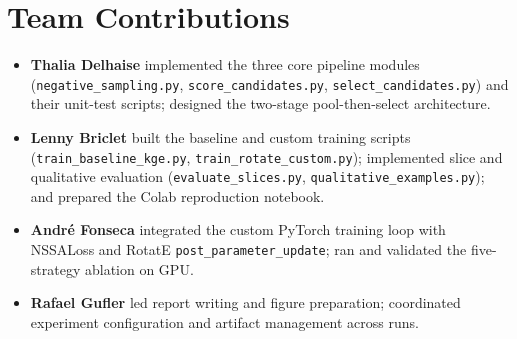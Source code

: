 \documentclass[10pt,twocolumn,letterpaper]{article}
\begin{document}
\section{Team Contributions}
\label{sec:contributions}
\begin{itemize}
  \item \textbf{Thalia Delhaise} implemented the three core pipeline modules
    (\texttt{negative\_sampling.py}, \texttt{score\_candidates.py},
    \texttt{select\_candidates.py}) and their unit-test scripts; designed the
    two-stage pool-then-select architecture.
  \item \textbf{Lenny Briclet} built the baseline and custom training scripts
    (\texttt{train\_baseline\_kge.py}, \texttt{train\_rotate\_custom.py});
    implemented slice and qualitative evaluation
    (\texttt{evaluate\_slices.py}, \texttt{qualitative\_examples.py}); and
    prepared the Colab reproduction notebook.
  \item \textbf{Andr\'e Fonseca} integrated the custom PyTorch training loop
    with NSSALoss and RotatE \texttt{post\_parameter\_update}; ran and
    validated the five-strategy ablation on GPU.
  \item \textbf{Rafael Gufler} led report writing and figure preparation;
    coordinated experiment configuration and artifact management across runs.
\end{itemize}

{\small


}
\end{document}
